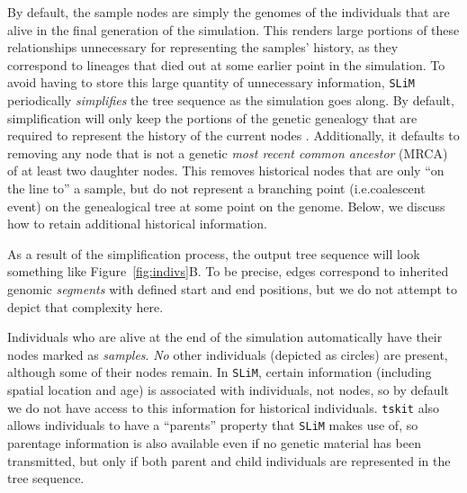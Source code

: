 \documentclass[12pt]{article}
\newcommand{\tskit}[0]{\texttt{tskit}\xspace}
\newcommand{\slim}[0]{\texttt{SLiM}\xspace}
\newcommand*{\ie}{i.e.\xcomma}
\begin{document}
By default, the sample nodes are simply the genomes of the individuals that are alive in the final generation
of the simulation. This renders large portions of these relationships unnecessary for representing the samples' history,
as they correspond to lineages that died out at some earlier point in the simulation.
To avoid having to
store this large quantity of unnecessary information, \slim periodically \textit{simplifies} the tree sequence
as the simulation goes along. By default, simplification will only keep the portions of the
genetic genealogy that are required to represent the history of the current nodes \citep{kelleher_efficient_2018}.
Additionally, it defaults to removing any node that is not a genetic
\textit{most recent common ancestor} (MRCA) of at least two daughter nodes. This removes historical
nodes that are only ``on the line to'' a sample, but do not represent a branching point
(\ie coalescent event) on the genealogical tree at some point on the genome.
Below, we discuss how to retain additional historical information.

As a result of the simplification process, the output tree sequence will look something like Figure~\ref{fig:indivs}B.
To be precise, edges correspond to inherited genomic \emph{segments} with defined start and end positions,
but we do not attempt to depict that complexity here.

Individuals who are alive at the end of the simulation automatically have their nodes marked as \textit{samples}.
\emph{No} other individuals (depicted as circles) are present,
although some of their nodes remain.
In \slim, certain information (including spatial location and age) is associated with individuals,
not nodes, so by default we do not have access to this information for historical individuals.
\tskit also allows individuals to have a ``parents'' property that \slim makes use of,
so parentage information is also available even if no genetic material has been transmitted,
but only if both parent and child individuals are represented in the tree sequence.

\end{document}

